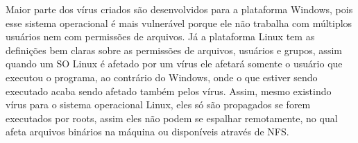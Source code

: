 Maior parte dos vírus criados são desenvolvidos para a plataforma Windows, pois esse sistema operacional
é mais vulnerável porque ele não trabalha com múltiplos usuários nem com permissões de arquivos. Já a plataforma
Linux tem as definições bem claras sobre as permissões de arquivos, usuários e grupos, assim quando um SO Linux é
afetado por um vírus ele afetará somente o usuário que executou o programa, ao contrário do Windows, onde o que estiver
sendo executado acaba sendo afetado também pelos vírus. Assim, mesmo existindo vírus para o sistema operacional Linux, eles
só são propagados se forem executados por roots, assim eles não podem se espalhar remotamente, no qual afeta arquivos binários
na máquina ou disponíveis através de NFS.

%



